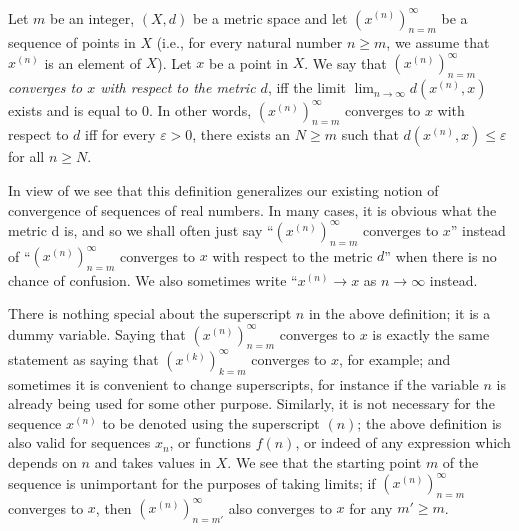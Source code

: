 \setcounter{thm}{13}
\begin{defn}\label{ii:1.1.14}
  Let \(m\) be an integer, \((X, d)\) be a metric space and let \((x^{(n)})_{n = m}^\infty\) be a sequence of points in \(X\)
  (i.e., for every natural number \(n \geq m\), we assume that \(x^{(n)}\) is an element of \(X\)).
  Let \(x\) be a point in \(X\).
  We say that \emph{\((x^{(n)})_{n = m}^\infty\) converges to \(x\) with respect to the metric \(d\)}, iff the limit \(\lim_{n \to \infty} d(x^{(n)}, x)\) exists and is equal to \(0\).
  In other words, \((x^{(n)})_{n = m}^\infty\) converges to \(x\) with respect to \(d\) iff for every \(\varepsilon > 0\), there exists an \(N \geq m\) such that \(d(x^{(n)}, x) \leq \varepsilon\) for all \(n \geq N\).
\end{defn}

\begin{rmk}\label{ii:1.1.15}
  In view of  we see that this definition generalizes our existing notion of convergence of sequences of real numbers.
  In many cases, it is obvious what the metric d is, and so we shall often just say ``\((x^{(n)})_{n = m}^\infty\) converges to \(x\)'' instead of ``\((x^{(n)})_{n = m}^\infty\) converges to \(x\) with respect to the metric \(d\)'' when there is no chance of confusion.
  We also sometimes write ``\(x^{(n)} \to x\) as \(n \to \infty\) instead.
\end{rmk}

\begin{rmk}\label{ii:1.1.16}
  There is nothing special about the superscript \(n\) in the above definition;
  it is a dummy variable.
  Saying that \((x^{(n)})_{n = m}^\infty\) converges to \(x\) is exactly the same statement as saying that \((x^{(k)})_{k = m}^\infty\) converges to \(x\), for example;
  and sometimes it is convenient to change superscripts, for instance if the variable \(n\) is already being used for some other purpose.
  Similarly, it is not necessary for the sequence \(x^{(n)}\) to be denoted using the superscript \((n)\);
  the above definition is also valid for sequences \(x_n\), or functions \(f(n)\), or indeed of any expression which depends on \(n\) and takes values in \(X\).
  We see that the starting point \(m\) of the sequence is unimportant for the purposes of taking limits;
  if \((x^{(n)})_{n = m}^\infty\) converges to \(x\), then \((x^{(n)})_{n = m'}^\infty\) also converges to \(x\) for any \(m' \geq m\).
\end{rmk}

